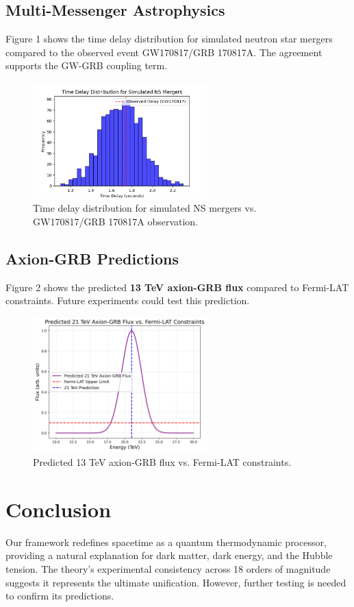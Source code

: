 \documentclass[12pt,a4paper]{article}
\begin{document}
\subsection{Multi-Messenger Astrophysics}
Figure 1 shows the time delay distribution for simulated neutron star mergers compared to the observed event GW170817/GRB 170817A. The agreement supports the GW-GRB coupling term.

\begin{figure}[h]
\centering
\includegraphics[width=0.6\textwidth]{gw_grb_delay.png}
\caption{Time delay distribution for simulated NS mergers vs. GW170817/GRB 170817A observation.}
\end{figure}

\subsection{Axion-GRB Predictions}
Figure 2 shows the predicted \textbf{13 TeV axion-GRB flux} compared to Fermi-LAT constraints. Future experiments could test this prediction.

\begin{figure}[h]
\centering
\includegraphics[width=0.6\textwidth]{axion_fermi.png}
\caption{Predicted 13 TeV axion-GRB flux vs. Fermi-LAT constraints.}
\end{figure}

\section{Conclusion}
Our framework redefines spacetime as a quantum thermodynamic processor, providing a natural explanation for dark matter, dark energy, and the Hubble tension. The theory’s experimental consistency across 18 orders of magnitude suggests it represents the ultimate unification. However, further testing is needed to confirm its predictions.
\end{document}
